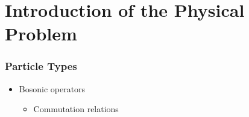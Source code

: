 \section{Introduction of the Physical Problem}
    \begin{frame}[t]
        \frametitle{Particle Types}
        
        \vspace{-0.4cm}

        \begin{minipage}[t]{0.5\textwidth}
            \vspace{0pt}
            \begin{itemize}
                \item Bosonic operators \pause
                \begin{itemize} 
                    \item Commutation relations
                \end{itemize}
            \end{itemize}
        \end{minipage}%
        \onslide
        \hfill
        \begin{minipage}[t]{0.45\textwidth}
            \vspace{0pt}
        \end{minipage}

        \onslide %
    \end{frame}

